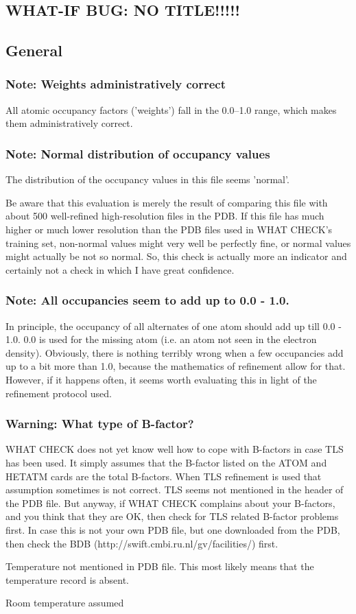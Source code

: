 \documentclass[a4paper]{article}
\def\showsect#1{
  \thesect\gdef\thesect{}
  \thessect\gdef\thessect{}
  \subsubsection{#1}
}
\gdef\thesect{\pagebreak[2]\section{WHAT-IF BUG: NO TITLE!!!!!}}
\gdef\thessect{\subsection{General}}
\begin{document}
\begin{note}
\showsect{Note: Weights administratively correct}
All atomic occupancy factors ('weights') fall in the 0.0--1.0 range, which
makes them administratively correct.
\end{note}

\begin{note}
\showsect{Note: Normal distribution of occupancy values}
 
The distribution of the occupancy values in this file seems 'normal'.
 
Be aware that this evaluation is merely the result of comparing this file
with about 500 well-refined high-resolution files in the PDB. If this file
has much higher or much lower resolution than the PDB files used
in WHAT CHECK's training set, non-normal values might very well be perfectly
fine, or normal values might actually be not so normal. So, this check is
actually more an indicator and certainly not a check in which I have great
confidence.
\end{note}

\begin{note}
\showsect{Note: All occupancies seem to add up to 0.0 - 1.0.}
In principle, the occupancy of all alternates of one atom should add up till
0.0 - 1.0. 0.0 is used for the missing atom (i.e. an atom not seen in the
electron density). Obviously, there is nothing terribly wrong when a few
occupancies add up to a bit more than 1.0, because the mathematics of
refinement allow for that. However, if it happens often, it seems worth
evaluating this in light of the refinement protocol used.
\end{note}

\begin{warning}
\showsect{Warning: What type of B-factor?}
WHAT CHECK does not yet know well how to cope with B-factors in case TLS has
been used. It simply assumes that the B-factor listed on the ATOM and HETATM
cards are the total B-factors. When TLS refinement is used that assumption
sometimes is not correct. TLS seems not mentioned in the header of the PDB
file. But anyway, if WHAT CHECK complains about your B-factors, and you think
that they are OK, then check for TLS related B-factor problems first.
In case this is not your own PDB file, but one downloaded from the PDB, then
check the BDB (http://swift.cmbi.ru.nl/gv/facilities/) first.
 
\parbox{1\textwidth}{
Temperature not mentioned in PDB file. This most likely means
that the temperature record is absent.
 
Room temperature assumed
 
}%
 
\end{warning}
\end{document}
